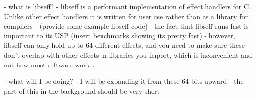 \documentclass{article}
\begin{document}
 - what is libseff?
    - libseff is a performant implementation of effect handlers for C. Unlike other effect handlers it is written for user use rather than as a library for compilers
    - (provide some example libseff code)
    - the fact that libseff runs fast is important to its USP (insert benchmarks showing its pretty fast)
    - however, libseff can only hold up to 64 different effects, and you need to make sure these don't overlap with other effects in libraries you import, which is inconvenient and not how most software works.

- what will I be doing?
    - I will be expanding it from these 64 bits upward
    - the part of this in the background should be very short






\end{document}
